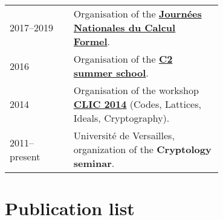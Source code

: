 \documentclass{book}
\begin{document}
\begin{tabular}{l p{0.7\linewidth}}
  2017--2019 & Organisation of the
               \href{http://jncf.math.cnrs.fr/}{\textbf{Journées Nationales du Calcul
               Formel}}.\\
  2016 & Organisation of the
         \href{https://ecole-c2-2016.inria.fr/}{\textbf{C2 summer school}}.\\
  2014
             & Organisation of the workshop
               \href{https://idealcodes.github.io/clic-2014}{\textbf{CLIC 2014}} (Codes,
               Lattices, Ideals, Cryptography).\\
  2011--present & Université de
                  Versailles, organization of the
                  \textbf{Cryptology
                  seminar}.
\end{tabular}

\section*{Publication list}
\end{document}
